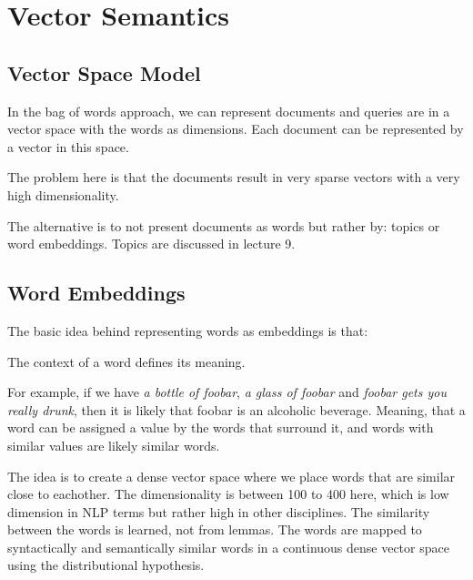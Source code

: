 \section{Vector Semantics}

\subsection{Vector Space Model}

In the bag of words approach, we can represent
documents and queries are in a vector space with
the words as dimensions. Each document can be
represented by a vector in this space.

The problem here is that the documents result in
very sparse vectors with a very high dimensionality.

The alternative is to not present documents as words
but rather by: topics or word embeddings. Topics are
discussed in lecture 9.

\subsection{Word Embeddings}

The basic idea behind representing words as
embeddings is that:

\begin{definition}
  The context of a word defines its meaning.
\end{definition}

For example, if we have \textit{a bottle of foobar},
\textit{a glass of foobar} and \textit{foobar gets you really drunk},
then it is likely that foobar is an alcoholic
beverage. Meaning, that a word can be assigned
a value by the words that surround it, and words
with similar values are likely similar words.

The idea is to create a dense vector space where we
place words that are similar close to eachother. The
dimensionality is between 100 to 400 here, which is
low dimension in NLP terms but rather high in other
disciplines. The similarity between the words is learned,
not from lemmas. The words are mapped to syntactically and semantically
similar words in a continuous dense vector space using the
distributional hypothesis.




